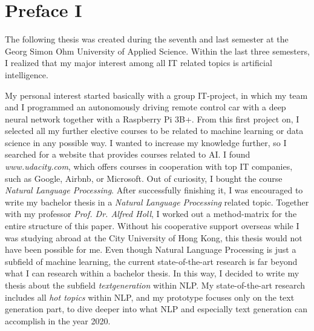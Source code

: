 \thispagestyle{empty}
\section*{Preface I}
\label{sec:prolog_1}

The following thesis was created during the seventh and last semester at the Georg Simon Ohm University of Applied Science. 
Within the last three semesters, I realized that my major interest among all IT related topics is artificial intelligence.

My personal interest started basically with a group IT-project, in which my team and I programmed an autonomously driving remote control car with a deep neural network together with a Raspberry Pi 3B+. From this first project on, I selected all my further elective courses to be related to machine learning or data science in any possible way. I wanted to increase my knowledge further, so I searched for a website that provides courses related to AI. I found \textit{www.udacity.com}, which offers courses in cooperation with top IT companies, such as Google, Airbnb, or Microsoft. Out of curiosity, I bought the course \textit{Natural Language Processing}. After successfully finishing it, I was encouraged to write my bachelor thesis in a \textit{Natural Language Processing} related topic. 
Together with my professor \textit{Prof. Dr. Alfred Holl}, I worked out a method-matrix for the entire structure of this paper. Without his cooperative support overseas while I was studying abroad at the City University of Hong Kong, this thesis would not have been possible for me.
Even though Natural Language Processing is just a subfield of machine learning, the current state-of-the-art research is far beyond what I can research within a bachelor thesis. In this way, I decided to write my thesis about the subfield \textit{textgeneration} within NLP. My state-of-the-art research includes all \textit{hot topics} within NLP, and my prototype focuses only on the text generation part, to dive deeper into what NLP and especially text generation can accomplish in the year 2020.
\null\newpage

